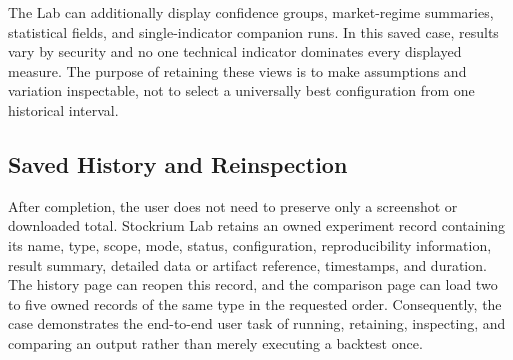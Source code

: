 The Lab can additionally display confidence groups, market-regime summaries, statistical fields, and single-indicator companion runs. In this saved case, results vary by security and no one technical indicator dominates every displayed measure. The purpose of retaining these views is to make assumptions and variation inspectable, not to select a universally best configuration from one historical interval.

\subsection{Saved History and Reinspection}
\label{subsec:saved-history-reinspection}

After completion, the user does not need to preserve only a screenshot or downloaded total. Stockrium Lab retains an owned experiment record containing its name, type, scope, mode, status, configuration, reproducibility information, result summary, detailed data or artifact reference, timestamps, and duration. The history page can reopen this record, and the comparison page can load two to five owned records of the same type in the requested order. Consequently, the case demonstrates the end-to-end user task of running, retaining, inspecting, and comparing an output rather than merely executing a backtest once.
